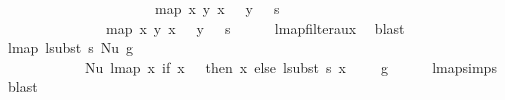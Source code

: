 \begin{isabellebody}
\ \ \ \ \ \ \ \ \ \ \ \ \ \ \ \ \ \ \ {\isacharparenleft}{\kern0pt}{\isacharparenleft}{\kern0pt}{}{\isacharcomma}{\kern0pt}\ {}{\isacharparenright}{\kern0pt}\ {\isacharhash}{\kern0pt}\ map\ {\isacharparenleft}{\kern0pt}{\isasymlambda}{\isacharparenleft}{\kern0pt}x{\isacharcomma}{\kern0pt}\ y{\isacharparenright}{\kern0pt}{\isachardot}{\kern0pt}\ {\isacharparenleft}{\kern0pt}x\ {\isacharplus}{\kern0pt}\ {}{\isacharcomma}{\kern0pt}\ y\ {\isacharplus}{\kern0pt}\ {}{\isacharparenright}{\kern0pt}{\isacharparenright}{\kern0pt}\ s{\isacharparenright}{\kern0pt}\ {\isacharequal}{\kern0pt}\isanewline
\ \ \ \ \ \ \ \ \ \ \ \ {\isacharparenleft}{\kern0pt}{}{\isacharcomma}{\kern0pt}\ {}{\isacharparenright}{\kern0pt}\ {\isacharhash}{\kern0pt}\ map\ {\isacharparenleft}{\kern0pt}{\isasymlambda}{\isacharparenleft}{\kern0pt}x{\isacharcomma}{\kern0pt}\ y{\isacharparenright}{\kern0pt}{\isachardot}{\kern0pt}\ {\isacharparenleft}{\kern0pt}x\ {\isacharplus}{\kern0pt}\ {}{\isacharcomma}{\kern0pt}\ y\ {\isacharplus}{\kern0pt}\ {}{\isacharparenright}{\kern0pt}{\isacharparenright}{\kern0pt}\ s{}{\isachardoublequoteclose}\isanewline
\ \ \ \ \isamarkupfalse%
\ lmap{\isacharunderscore}{\kern0pt}filter{\isacharunderscore}{\kern0pt}aux{}\ \isamarkupfalse%
\ blast\isanewline
\isanewline
\ \ \isamarkupfalse%
\ {\isachardoublequoteopen}lmap\ {\isacharparenleft}{\kern0pt}lsubst\ s{\isacharparenright}{\kern0pt}\ {\isacharparenleft}{\kern0pt}Nu\ g{\isacharparenright}{\kern0pt}\ {\isacharequal}{\kern0pt}\isanewline
\ \ \ \ \ \ \ \ \ \ \ \ Nu\ {\isacharparenleft}{\kern0pt}lmap\ {\isacharparenleft}{\kern0pt}{\isasymlambda}x{\isachardot}{\kern0pt}\ if\ x\ {\isacharequal}{\kern0pt}\ {}\ then\ x\ else\ {\isacharparenleft}{\kern0pt}{\isacharparenleft}{\kern0pt}lsubst\ s{\isacharparenright}{\kern0pt}\ {\isacharparenleft}{\kern0pt}x\ {\isacharminus}{\kern0pt}\ {}{\isacharparenright}{\kern0pt}\ {\isacharplus}{\kern0pt}\ {}{\isacharparenright}{\kern0pt}{\isacharparenright}{\kern0pt}\ g{\isacharparenright}{\kern0pt}{\isachardoublequoteclose}\isanewline
\ \ \ \ \isamarkupfalse%
\ lmap{\isachardot}{\kern0pt}simps{\isacharparenleft}{\kern0pt}{}{\isacharparenright}{\kern0pt}\ \isamarkupfalse%
\ blast\isanewline
\ \ \isamarkupfalse%
\ \isamarkupfalse%

\end{isabellebody}
